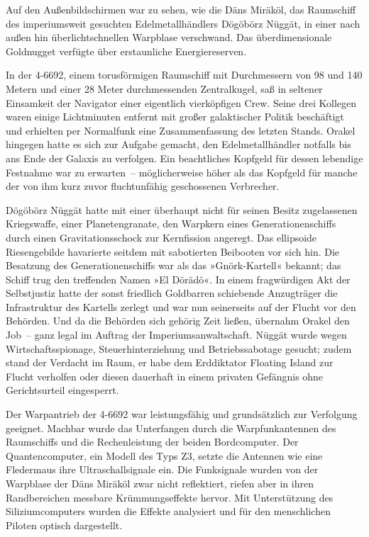 Auf den Außenbildschirmen war zu sehen, wie die Däns Miräköl, das Raumschiff des imperiumsweit gesuchten Edelmetallhändlers Dögöbörz Nüggät, in einer nach außen hin überlichtschnellen Warpblase verschwand. Das überdimensionale Goldnugget verfügte über erstaunliche Energiereserven.

In der 4-6692, einem torusförmigen Raumschiff mit Durchmessern von 98 und 140 Metern und einer 28 Meter durchmessenden Zentralkugel, saß in seltener Einsamkeit der Navigator einer eigentlich vierköpfigen Crew. Seine drei Kollegen waren einige Lichtminuten entfernt mit großer galaktischer Politik beschäftigt und erhielten per Normalfunk eine Zusammenfassung des letzten Stands. Orakel hingegen hatte es sich zur Aufgabe gemacht, den Edelmetallhändler notfalls bis ans Ende der Galaxis zu verfolgen. Ein beachtliches Kopfgeld für dessen lebendige Festnahme war zu erwarten~– möglicherweise höher als das Kopfgeld für manche der von ihm kurz zuvor fluchtunfähig geschossenen Verbrecher.

Dögöbörz Nüggät hatte mit einer überhaupt nicht für seinen Besitz zugelassenen Kriegswaffe, einer Planetengranate, den Warpkern eines Generationenschiffs durch einen Gravitationsschock zur Kernfission angeregt. Das ellipsoide Riesengebilde havarierte seitdem mit sabotierten Beibooten vor sich hin. Die Besatzung des Generationenschiffs war als das »Gnörk-Kartell« bekannt; das Schiff trug den treffenden Namen »El Dörädö«. In einem fragwürdigen Akt der Selbstjustiz hatte der sonst friedlich Goldbarren schiebende Anzugträger die Infrastruktur des Kartells zerlegt und war nun seinerseits auf der Flucht vor den Behörden. Und da die Behörden sich gehörig Zeit ließen, übernahm Orakel den Job~– ganz legal im Auftrag der Imperiumsanwaltschaft. Nüggät wurde wegen Wirtschaftsspionage, Steuerhinterziehung und Betriebssabotage gesucht; zudem stand der Verdacht im Raum, er habe dem Erddiktator Floating Island zur Flucht verholfen oder diesen dauerhaft in einem privaten Gefängnis ohne Gerichtsurteil eingesperrt.

Der Warpantrieb der 4-6692 war leistungsfähig und grundsätzlich zur Verfolgung geeignet. Machbar wurde das Unterfangen durch die Warpfunkantennen des Raumschiffs und die Rechenleistung der beiden Bordcomputer. Der Quantencomputer, ein Modell des Typs Z3, setzte die Antennen wie eine Fledermaus ihre Ultraschallsignale ein. Die Funksignale wurden von der Warpblase der Däns Miräköl zwar nicht reflektiert, riefen aber in ihren Randbereichen messbare Krümmungseffekte hervor. Mit Unterstützung des Siliziumcomputers wurden die Effekte analysiert und für den menschlichen Piloten optisch dargestellt.

